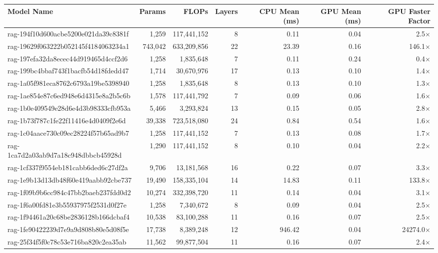 \begin{table}[h!]
\centering
\fontsize{7}{9}\selectfont
\begin{tabular}{lrrrrrr}
\toprule
\textbf{Model Name} & \textbf{Params} & \textbf{FLOPs} & \textbf{Layers} & \textbf{CPU Mean (ms)} & \textbf{GPU Mean (ms)} & \textbf{GPU Faster Factor} \\
\midrule
rag-194f10d600acbe5200e021da39c8381f & 1,259 & 117,441,152 & 8 & 0.11 & 0.04 & 2.5$\times$ \\
rag-19629f063222b052145f4184063234a1 & 743,042 & 633,209,856 & 22 & 23.39 & 0.16 & 146.1$\times$ \\
rag-197efa32da8ecec44d919465d4ccf2d6 & 1,258 & 1,835,648 & 7 & 0.11 & 0.24 & 0.4$\times$ \\
rag-199bc4bbaf743f1bacfb54d18fdedd47 & 1,714 & 30,670,976 & 17 & 0.13 & 0.10 & 1.4$\times$ \\
rag-1a05f981eca8762c6793a19be5398940 & 1,258 & 1,835,648 & 8 & 0.13 & 0.10 & 1.3$\times$ \\
rag-1ae854e87c6ed948e6d4315e8a2b5c6b & 1,578 & 117,441,792 & 7 & 0.09 & 0.06 & 1.6$\times$ \\
rag-1b0e409549e28d6e4d3b98333cfb953a & 5,466 & 3,293,824 & 13 & 0.15 & 0.05 & 2.8$\times$ \\
rag-1b73f787c1fe22f11416e4d0409f2e6d & 39,338 & 723,518,080 & 24 & 0.84 & 0.54 & 1.6$\times$ \\
rag-1c04aace730c09ec28224f57b65ad9b7 & 1,258 & 117,441,152 & 7 & 0.13 & 0.08 & 1.7$\times$ \\
rag-1ca7d2a03ab9d7a18c948dbbcb45928d & 1,290 & 117,441,152 & 8 & 0.10 & 0.04 & 2.2$\times$ \\
rag-1cf337f9554eb181cabb6ded6c27df2a & 9,706 & 13,181,568 & 16 & 0.22 & 0.07 & 3.3$\times$ \\
rag-1e9b13d13db48f60e419aabb92cbe737 & 19,490 & 158,335,104 & 14 & 14.83 & 0.11 & 133.8$\times$ \\
rag-1f09b9b6cc984c47bb2baeb237fdd0d2 & 10,274 & 332,398,720 & 11 & 0.14 & 0.04 & 3.1$\times$ \\
rag-1f6a00fd81e3b55937975f2531d0f27e & 1,258 & 7,340,672 & 8 & 0.09 & 0.04 & 2.5$\times$ \\
rag-1f94461a20c68be2836128b166dcbaf4 & 10,538 & 83,100,288 & 11 & 0.16 & 0.07 & 2.5$\times$ \\
rag-1fe90422239d7e9a9d808b80e5d08f5e & 17,738 & 8,389,248 & 12 & 946.42 & 0.04 & 24274.0$\times$ \\
rag-25f34f5f0c78c53e716ba820c2ea35ab & 11,562 & 99,877,504 & 11 & 0.16 & 0.07 & 2.4$\times$ \\

\end{tabular}
\end{table}
